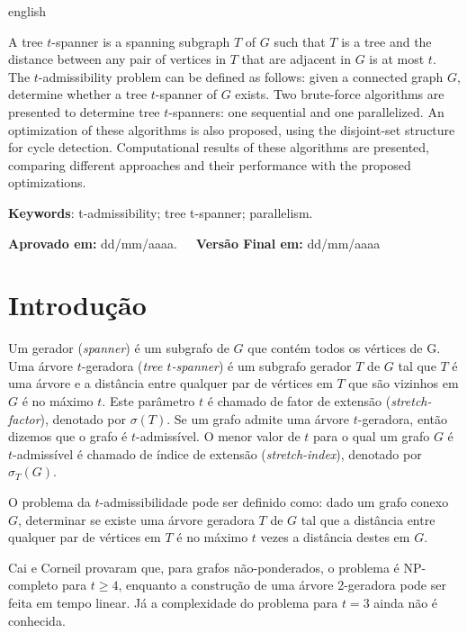 \documentclass[article,a4paper,12pt,brazil,sumario=tradicional]{abntex2}
\theoremstyle{definition} %
\begin{document}
\vspace{-.3cm}
\begin{hyphenrules}{english}

\noindent A tree $t$-spanner is a spanning subgraph $T$ of $G$ such that $T$ is a tree and the distance between any pair of vertices in $T$ that are adjacent in $G$ is at most $t$. The $t$-admissibility problem can be defined as follows: given a connected graph $G$, determine whether a tree $t$-spanner of $G$ exists. Two brute-force algorithms are presented to determine tree $t$-spanners: one sequential and one parallelized. An optimization of these algorithms is also proposed, using the disjoint-set structure for cycle detection. Computational results of these algorithms are presented, comparing different approaches and their performance with the proposed optimizations.

\end{hyphenrules}
\vspace{.4cm}

\noindent \textbf{Keywords}: t-admissibility; tree t-spanner; parallelism.

\vspace{.4cm}

\noindent \textbf{Aprovado em:} dd/mm/aaaa.~~~\textbf{Versão Final em:} dd/mm/aaaa

\section{Introdução}

Um gerador (\textit{spanner}) é um subgrafo de $G$ que contém todos os vértices de G$.$ Uma árvore $t$-geradora (\textit{tree $t$-spanner}) é um subgrafo gerador $T$ de $G$ tal que $T$ é uma árvore e a distância entre qualquer par de vértices em $T$ que são vizinhos em $G$ é no máximo $t$. Este parâmetro $t$ é chamado de fator de extensão (\textit{stretch-factor}), denotado por $\sigma(T)$. Se um grafo admite uma árvore $t$-geradora, então dizemos que o grafo é $t$-admissível. O menor valor de $t$ para o qual um grafo $G$ é $t$-admissível é chamado de índice de extensão (\textit{stretch-index}), denotado por $\sigma_T(G)$.

O problema da $t$-admissibilidade pode ser definido como: dado um grafo conexo $G$, determinar se existe uma árvore geradora $T$ de $G$ tal que a distância entre qualquer par de vértices em $T$ é no máximo $t$ vezes a distância destes em $G$.

Cai e Corneil \cite{doi:10.1137/S0895480192237403} provaram que, para grafos não-ponderados, o problema é NP-completo para $t\geq4$, enquanto a construção de uma árvore 2-geradora pode ser feita em tempo linear. Já a complexidade do problema para $t=3$ ainda não é conhecida.
\end{document}
